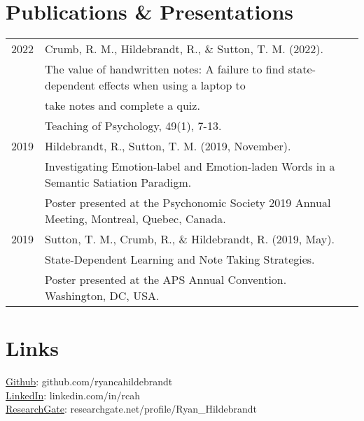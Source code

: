 \documentclass[letterpaper]{deedy-resume_sm} %
\begin{document}
\section{Publications \& Presentations} 
\begin{tabular}{rll}

2022 & Crumb, R. M., Hildebrandt, R., \& Sutton, T. M. (2022). \\ 
& The value of handwritten notes: A failure to find state-dependent effects when using a laptop to \\
& take notes and complete a quiz. \\
& Teaching of Psychology, 49(1), 7-13.\\

2019 & Hildebrandt, R., Sutton, T. M. (2019, November). \\ 
& Investigating Emotion-label and Emotion-laden Words in a Semantic Satiation Paradigm. \\
& Poster presented at the Psychonomic Society 2019 Annual Meeting, Montreal, Quebec, Canada. \\

2019 & Sutton, T. M., Crumb, R., \& Hildebrandt, R. (2019, May). \\
& State-Dependent Learning and Note Taking Strategies. \\
& Poster presented at the APS Annual Convention. Washington, DC, USA.\\

\end{tabular}
\sectionspace %

\section{Links} 
\href{https://github.com/ryancahildebrandt}{Github}: github.com/ryancahildebrandt \\
\href{https://linkedin.com/in/rcah}{LinkedIn}: linkedin.com/in/rcah \\
\href{https://researchgate.net/profile/Ryan\_Hildebrandt}{ResearchGate}: researchgate.net/profile/Ryan\_Hildebrandt 
\sectionspace %
\hfill
\end{document}
